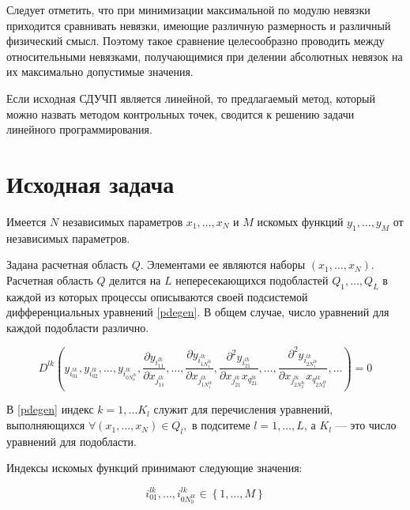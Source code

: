\documentclass[a4paper,12pt]{article}
\begin{document}
  Следует отметить, что при минимизации максимальной по модулю невязки
  приходится сравнивать невязки, имеющие различную размерность и
  различный физический смысл. Поэтому такое сравнение целесообразно
  проводить между относительными невязками, получающимися при делении
  абсолютных невязок на их максимально допустимые значения.
  
  Если исходная СДУЧП является линейной, то предлагаемый метод,
  который можно назвать методом контрольных точек, сводится к решению
  задачи линейного программирования.


  \section{Исходная задача}

  Имеется $N$ независимых параметров $x_1,\ldots,x_N$ и $M$ искомых
  функций $y_1,\ldots,y_M$ от независимых параметров.

  Задана расчетная область $Q$. Элементами ее являются наборы
  $(x_1,\ldots,x_N)$. Расчетная область $Q$ делится на $L$
  непересекающихся подобластей $Q_1,\ldots,Q_L$ в каждой из которых
  процессы описываются своей подсистемой дифференциальных
  уравнений \eqref{pdegen}. В общем случае, число уравнений для каждой
  подобласти различно.

  \begin{equation}
    \label{pdegen}
    D^{lk} (
    y_{i^{lk}_{01}}, y_{i^{lk}_{02}}, \ldots,y_{i^{lk}_{0N^{lk}_0}},
    \frac{\partial y_{i^{lk}_{11}}}{\partial x_{j^{lk}_{11}}},\ldots,
    \frac{\partial y_{i^{lk}_{1N^{lk}_1}}}{\partial x_{j^{lk}_{1N^{lk}_1}}},
    \frac{\partial^2 y_{i^{lk}_{21}}}{\partial x_{j^{lk}_{21}}x_{q^{lk}_{21}}},\ldots,
    \frac{\partial^2 y_{i^{lk}_{2N^{lk}_1}}}{\partial x_{j^{lk}_{2N^{lk}_2}}x_{q^{lk}_{2N^{lk}_2}}},
    \ldots) = 0
  \end{equation}

  В \eqref{pdegen} индекс $k = 1,\ldots K_l$ служит для перечисления
  уравнений, выполняющихся $\forall (x_1,\ldots,x_N) \in Q_l,$ в
  подситеме $l= 1,\ldots,L$, а $K_l$ --- это число уравнений для
  подобласти.

  Индексы искомых функций принимают следующие значения:

  \begin{equation*}
    i_{01}^{lk},\ldots,i_{0N_0^{lk}}^{lk} \in \left\{
    1,\ldots,M\right\}
  \end{equation*}
\end{document}
